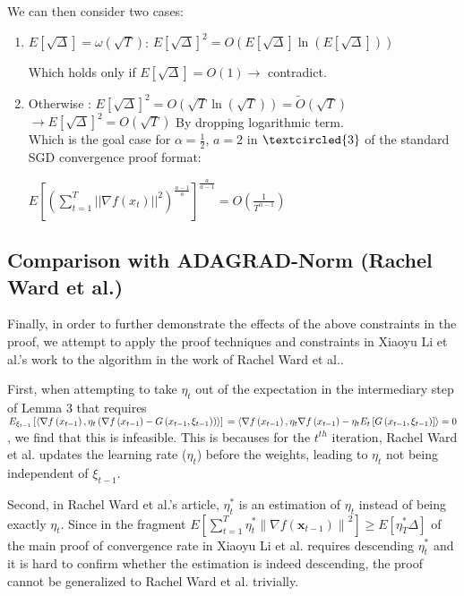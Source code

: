 \documentclass[14pt,onecolumn,letterpaper]{extarticle}
\begin{document}
\par\vspace{3mm}
We can then consider two cases:
    \begin{enumerate}
        \item$E\left[\sqrt{\Delta}\right] = \omega \left(\sqrt{T}\right)$: 
        $E\left[\sqrt{\Delta}\right]^{2} = O\left(E\left[\sqrt{\Delta}\right]\ln\left(E\left[\sqrt{\Delta}\right]\right)\right)$ \\ 
        \par\vspace{3mm}
        Which holds only if $E\left[\sqrt{\Delta}\right] = O\left(1\right)\rightarrow$ contradict.
        \item Otherwise : $E\left[\sqrt{\Delta}\right]^2 = O\left(\sqrt{T}\ln\left(\sqrt{T}\right)\right)=\tilde{O}\left(\sqrt{T}\right)$\\
        $\rightarrow  E\left[\sqrt{\Delta}\right]^2=O\left(\sqrt{T}\right)$ By
        dropping logarithmic term.
        \\Which is the goal case for $\alpha = \frac{1}{2}$, $a = 2$ in $\textcircled{3}$ of the standard SGD convergence proof format:
        \par\vspace{3mm}
        $E\left[(\sum_{t=1}^{T}||\nabla f(x_t)||^2)^\frac{a-1}{a}\right]^{\frac{a}{a-1}} = O(\frac{1}{T^{\alpha - 1}})$
    \end{enumerate}

\subsection{Comparison with ADAGRAD-Norm (Rachel Ward et al.)}
Finally, in order to further demonstrate the effects of the above constraints in the proof, we attempt to apply the proof techniques and constraints in Xiaoyu Li et al.'s work to the algorithm in the work of Rachel Ward et al.. \par
First, when attempting to take $\eta_t$ out of the expectation in the intermediary step of Lemma 3 that requires $E_{\xi_{t-1}}\left[\left\langle\nabla f\left(x_{t-1}\right), \eta_t\left(\nabla f\left(x_{t-1}\right)-G\left(x_{t-1}, \xi_{t-1}\right)\right)\right\rangle\right]\\=\left\langle\nabla f\left(x_{t-1}\right), \eta_t \nabla f\left(x_{t-1}\right)-\eta_t E_t\left[G\left(x_{t-1}, \xi_{t-1}\right)\right]\right\rangle=0$, we find that this is infeasible. This is becauses for the $t^{th}$ iteration, Rachel Ward et al. updates the learning rate ($\eta_t$) before the weights, leading to $\eta_t$ not being independent of $\xi_{t-1}$.\par
Second, in Rachel Ward et al.'s article, $\eta_t^*$ is an estimation of $\eta_t$ instead of being exactly $\eta_t$. Since in the fragment $E\left[\sum_{t=1}^T \eta_t^*\left\|\nabla f\left(\boldsymbol{x}_{t-1}\right)\right\|^2\right] \geq E\left[\eta_T^* \Delta\right]$ of the main proof of convergence rate in Xiaoyu Li et al. requires descending $\eta_t^*$ and it is hard to confirm whether the estimation is indeed descending, the proof cannot be generalized to Rachel Ward et al. trivially.
\end{document}

